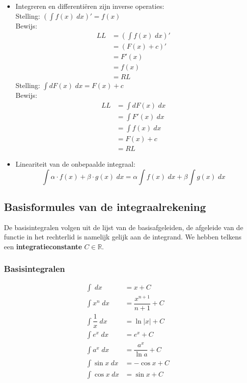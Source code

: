 \documentclass[a4paper,12pt, twoside]{article}
\begin{document}
\begin{itemize}
\item Integreren en differentiëren zijn inverse operaties:\\
  Stelling: $\displaystyle \left(\int f(x) \;dx \right)'=f(x)$\\
  Bewijs:
  \begin{align*}
    LL &= \left(\int f(x) \;dx \right)'\\
       &= \left(F(x) + c \right)'\\
       &= F'(x)\\
       &= f(x)\\
       &= RL
  \end{align*}
  Stelling: $\displaystyle \int dF(x) \;dx = F(x) + c$\\
  Bewijs:
  \begin{align*}
    LL &= \int dF(x) \;dx\\
       &= \int F'(x) \;dx\\
       &= \int f(x) \;dx\\
       &= F(x) + c\\
       &= RL
  \end{align*}
\item Lineariteit van de onbepaalde integraal:
  $$\int \alpha \cdot f(x) + \beta \cdot g(x)\;dx = \alpha \int f(x)\;dx + \beta \int g(x)\;dx$$
\end{itemize}

\subsection{Basisformules van de integraalrekening}

De basisintegralen volgen uit de lijst van de basisafgeleiden, de afgeleide van de functie in het rechterlid is namelijk gelijk aan de integrand. We hebben telkens een {\bf integratieconstante} $C\in\mathbb{R}$.

\subsubsection*{Basisintegralen}

\begin{align*}
  \int \;dx &= x + C\\
  \int x^n \;dx &= \dfrac{x^{n+1}}{n+1} + C\\
  \int \dfrac{1}{x} \;dx &= \ln|x| + C\\
  \int e^x \;dx &= e^x + C\\
  \int a^x \;dx &= \dfrac{a^x}{\ln a} + C\\
  \int \sin x \;dx &= -\cos x + C\\
  \int \cos x \;dx &= \sin x + C
\end{align*}
\end{document}
